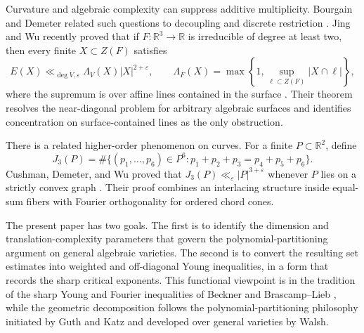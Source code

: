 \documentclass[11pt]{amsart}
\numberwithin{equation}{section}
\theoremstyle{definition}
\theoremstyle{remark}
\newcommand{\R}{\mathbb R}
\newcommand{\eps}{\varepsilon}
\newcommand{\1}{\mathbf 1}
\newcommand{\card}[1]{\lvert #1\rvert}
\begin{document}
Curvature and algebraic complexity can suppress additive multiplicity.  Bourgain and Demeter related such questions to decoupling and discrete restriction \cite{BourgainDemeter}.  Jing and Wu recently proved that if $F:\R^3\to\R$ is irreducible of degree at least two, then every finite $X\subset Z(F)$ satisfies
\begin{equation}\label{eq:jw-intro}
 E(X)\ll_{\deg V,\eps}\Lambda_V(X)\card X^{2+\eps},
 \qquad
 \Lambda_F(X)=\max\left\{1,\sup_{\ell\subset Z(F)}\card{X\cap\ell}\right\},
\end{equation}
where the supremum is over affine lines contained in the surface \cite{JingWu}.  Their theorem resolves the near-diagonal problem for arbitrary algebraic surfaces and identifies concentration on surface-contained lines as the only obstruction.

There is a related higher-order phenomenon on curves.  For a finite $P\subset\R^2$, define
\begin{equation}\label{eq:J3-intro}
 J_3(P)=\#\{(p_1,\dots,p_6)\in P^6:p_1+p_2+p_3=p_4+p_5+p_6\}.
\end{equation}
Cushman, Demeter, and Wu proved that $J_3(P)\ll_\eps \card P^{3+\eps}$ whenever $P$ lies on a strictly convex graph \cite{CDW}.  Their proof combines an interlacing structure inside equal-sum fibers with Fourier orthogonality for ordered chord cones.

The present paper has two goals.  The first is to identify the dimension and translation-complexity parameters that govern the polynomial-partitioning argument on general algebraic varieties.  The second is to convert the resulting set estimates into weighted and off-diagonal Young inequalities, in a form that records the sharp critical exponents.  This functional viewpoint is in the tradition of the sharp Young and Fourier inequalities of Beckner and Brascamp--Lieb \cite{Beckner,BrascampLieb}, while the geometric decomposition follows the polynomial-partitioning philosophy initiated by Guth and Katz \cite{GuthKatz} and developed over general varieties by Walsh.
\end{document}
